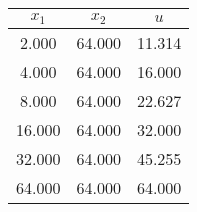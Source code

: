 \begin{tabular}{ccc}
\toprule
$x_1$ & $x_2$ & $u$ \\
\midrule
2.000 & 64.000 & 11.314 \\
4.000 & 64.000 & 16.000 \\
8.000 & 64.000 & 22.627 \\
16.000 & 64.000 & 32.000 \\
32.000 & 64.000 & 45.255 \\
64.000 & 64.000 & 64.000 \\
\bottomrule
\end{tabular}
